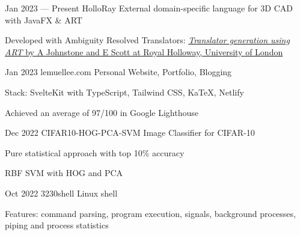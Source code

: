 \projectEntry
{Jan 2023 --- Present}
{HolloRay}
{External domain-specific language for 3D CAD with JavaFX \& ART}
{
\begin{descitemize}
	\item Developed with Ambiguity Resolved Translators: \href{https://pure.royalholloway.ac.uk/ws/portalfiles/portal/25269180/artTool.pdf}
 {\textit{Translator generation using ART} by A Johnstone and E Scott at Royal Holloway, University of London}
\end{descitemize}
}

\projectEntry
{Jan 2023}
{lemuellee.com}
{Personal Website, Portfolio, Blogging}
{
\begin{descitemize}
    \item Stack: SvelteKit with TypeScript, Tailwind CSS, KaTeX, Netlify
	\item Achieved an average of 97/100 in Google Lighthouse
\end{descitemize}
}

\projectEntry
{Dec 2022}
{CIFAR10-HOG-PCA-SVM}
{Image Classifier for CIFAR-10}
{
\begin{descitemize}
    \specialitem Pure statistical approach with top 10\% accuracy
    \item RBF SVM with HOG and PCA
\end{descitemize}
}


\projectEntry
{Oct 2022}
{3230shell}
{Linux shell}
{
\begin{descitemize}
    \item Features: command parsing, program execution, signals, background processes, piping and process statistics
\end{descitemize}
}


